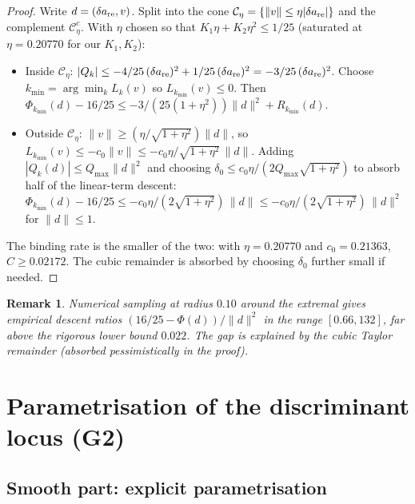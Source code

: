 \documentclass[11pt,a4paper]{article}
\newtheorem{remark}[theorem]{Remark}
\begin{document}
\begin{proof}
Write $d = (\delta a_{\rm re}, v)$. Split into the cone
$\mathcal C_\eta = \{\|v\|\le \eta|\delta a_{\rm re}|\}$ and the
complement $\mathcal C_\eta^c$. With $\eta$ chosen so that
$K_1\eta + K_2\eta^2 \le 1/25$ (saturated at $\eta=0.20770$ for our
$K_1,K_2$):
\begin{itemize}
\item Inside $\mathcal C_\eta$: $|Q_k| \le -4/25 \,(\delta a_{\rm re})^2
  + 1/25\,(\delta a_{\rm re})^2 = -3/25\,(\delta a_{\rm re})^2$. Choose
  $k_{\min}=\arg\min_k L_k(v)$ so $L_{k_{\min}}(v)\le 0$. Then
  $\Phi_{k_{\min}}(d)-16/25 \le -3/(25(1+\eta^2))\|d\|^2 +
  R_{k_{\min}}(d)$.
\item Outside $\mathcal C_\eta$: $\|v\|\ge (\eta/\sqrt{1+\eta^2})\|d\|$,
  so $L_{k_{\min}}(v)\le -c_0\|v\|\le -c_0\eta/\sqrt{1+\eta^2}\,\|d\|$.
  Adding $|Q_k(d)|\le Q_{\max}\|d\|^2$ and choosing $\delta_0\le c_0\eta/(2 Q_{\max}\sqrt{1+\eta^2})$
  to absorb half of the linear-term descent:
  $\Phi_{k_{\min}}(d) - 16/25 \le -c_0\eta/(2\sqrt{1+\eta^2})\,\|d\|
  \le -c_0\eta/(2\sqrt{1+\eta^2})\,\|d\|^2$ for $\|d\|\le 1$.
\end{itemize}
The binding rate is the smaller of the two: with $\eta=0.20770$ and
$c_0=0.21363$, $C\ge 0.02172$. The cubic remainder is absorbed by
choosing $\delta_0$ further small if needed.
\end{proof}

\begin{remark}
Numerical sampling at radius $0.10$ around the extremal gives
empirical descent ratios $(16/25-\Phi(d))/\|d\|^2$ in the range
$[0.66, 132]$, far above the rigorous lower bound $0.022$. The gap is
explained by the cubic Taylor remainder (absorbed pessimistically in
the proof).
\end{remark}

\section{Parametrisation of the discriminant locus (G2)}
\label{sec:G2}

\subsection{Smooth part: explicit parametrisation}
\end{document}
